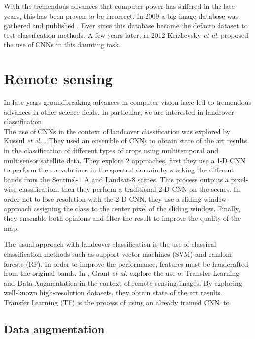 With the tremendous advances that computer power has suffered in the late years, this has been proven to be incorrect. In 2009 a big image database was gathered and published \cite{Deng09imagenet:a}. Ever since this database became the defacto dataset to test classification methods. A few years later, in 2012 Krizhevsky \textit{et al.} \cite{krizhevsky} proposed the use of CNNs in this daunting task.\\

\section{Remote sensing}

In late years groundbreaking advances in computer vision have led to tremendous advances in other science fields. In particular, we are interested in landcover classification.\\

The use of CNNs in the context of landcover classification was explored by Kussul \textit{et al.} \cite{7891032}. They used an ensemble of CNNs to obtain state of the art results in the classification of different types of crops using multitemporal and multisensor satellite data. They explore 2 approaches, first they use a 1-D CNN to perform the convolutions in the spectral domain by stacking the different bands from the Sentinel-1 A and Landsat-8 scenes. This process outputs a pixel-wise classification, then they perform a traditional 2-D CNN on the scenes. In order not to lose resolution with the 2-D CNN, they use a sliding window approach assigning the class to the center pixel of the sliding window. Finally, they ensemble both opinions and filter the result to improve the quality of the map.

The usual approach with landcover classification is the use of classical classification methods such as support vector machines (SVM) and random forests (RF). In order to improve the performance, features must be handcrafted from the original bands. In \cite{7858676}, Grant \textit{et al.} explore the use of Transfer Learning and Data Augmentation in the context of remote sensing images. By exploring well-known high-resolution datasets, they obtain state of the art results.\\

Transfer Learning (TF) is the process of using an already trained CNN, to 

\subsection{Data augmentation}

